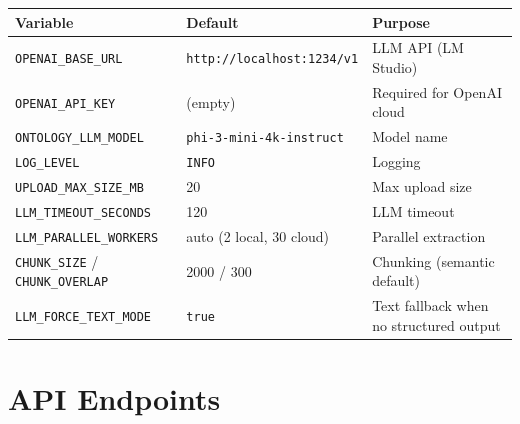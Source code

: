 \documentclass[11pt,a4paper]{article}
\begin{document}
\begin{center}
\begin{tabular}{@{}llp{5cm}@{}}
\toprule
\textbf{Variable} & \textbf{Default} & \textbf{Purpose} \\
\midrule
\texttt{OPENAI\_BASE\_URL} & \texttt{http://localhost:1234/v1} & LLM API (LM Studio) \\
\texttt{OPENAI\_API\_KEY} & (empty) & Required for OpenAI cloud \\
\texttt{ONTOLOGY\_LLM\_MODEL} & \texttt{phi-3-mini-4k-instruct} & Model name \\
\texttt{LOG\_LEVEL} & \texttt{INFO} & Logging \\
\texttt{UPLOAD\_MAX\_SIZE\_MB} & 20 & Max upload size \\
\texttt{LLM\_TIMEOUT\_SECONDS} & 120 & LLM timeout \\
\texttt{LLM\_PARALLEL\_WORKERS} & auto (2 local, 30 cloud) & Parallel extraction \\
\texttt{CHUNK\_SIZE} / \texttt{CHUNK\_OVERLAP} & 2000 / 300 & Chunking (semantic default) \\
\texttt{LLM\_FORCE\_TEXT\_MODE} & \texttt{true} & Text fallback when no structured output \\
\bottomrule
\end{tabular}
\end{center}

\section{API Endpoints}
\end{document}

